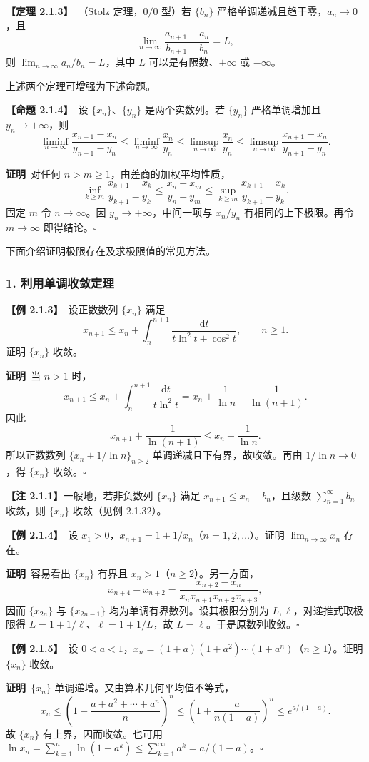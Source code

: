 \documentclass[UTF8,a4paper,11pt]{ctexart}
\newcommand{\ex}[1]{\par\medskip\noindent\textbf{【例 #1】}\ }
\newcommand{\prop}[1]{\par\medskip\noindent\textbf{【命题 #1】}\ }
\newcommand{\thm}[1]{\par\medskip\noindent\textbf{【定理 #1】}\ }
\newcommand{\pf}{\par\noindent\textbf{证明}\ }
\begin{document}
\thm{2.1.3}（Stolz 定理，$0/0$ 型）若 $\{b_n\}$ 严格单调递减且趋于零，$a_n\to0$，且
\[
\lim_{n\to\infty}\frac{a_{n+1}-a_n}{b_{n+1}-b_n}=L,
\]
则 $\lim_{n\to\infty}a_n/b_n=L$，其中 $L$ 可以是有限数、$+\infty$ 或 $-\infty$。

上述两个定理可增强为下述命题。

\prop{2.1.4}设 $\{x_n\}$、$\{y_n\}$ 是两个实数列。若 $\{y_n\}$ 严格单调增加且 $y_n\to+\infty$，则
\[
\liminf_{n\to\infty}\frac{x_{n+1}-x_n}{y_{n+1}-y_n}
\le\liminf_{n\to\infty}\frac{x_n}{y_n}
\le\limsup_{n\to\infty}\frac{x_n}{y_n}
\le\limsup_{n\to\infty}\frac{x_{n+1}-x_n}{y_{n+1}-y_n}.
\]
\pf 对任何 $n>m\ge1$，由差商的加权平均性质，
\[
\inf_{k\ge m}\frac{x_{k+1}-x_k}{y_{k+1}-y_k}
\le\frac{x_n-x_m}{y_n-y_m}
\le\sup_{k\ge m}\frac{x_{k+1}-x_k}{y_{k+1}-y_k}.
\]
固定 $m$ 令 $n\to\infty$。因 $y_n\to+\infty$，中间一项与 $x_n/y_n$ 有相同的上下极限。再令 $m\to\infty$ 即得结论。\hfill$\square$

下面介绍证明极限存在及求极限值的常见方法。

\subsubsection*{1. 利用单调收敛定理}
\ex{2.1.3}设正数数列 $\{x_n\}$ 满足
\[
x_{n+1}\le x_n+\int_n^{n+1}\frac{\mathrm dt}{t\ln^2t+\cos^2t},\qquad n\ge1.
\]
证明 $\{x_n\}$ 收敛。
\pf 当 $n>1$ 时，
\[
x_{n+1}\le x_n+\int_n^{n+1}\frac{\mathrm dt}{t\ln^2t}
=x_n+\frac1{\ln n}-\frac1{\ln(n+1)}.
\]
因此
\[
x_{n+1}+\frac1{\ln(n+1)}\le x_n+\frac1{\ln n}.
\]
所以正数数列 $\{x_n+1/\ln n\}_{n\ge2}$ 单调递减且下有界，故收敛。再由 $1/\ln n\to0$，得 $\{x_n\}$ 收敛。\hfill$\square$

\noindent\textbf{【注 2.1.1】}一般地，若非负数列 $\{x_n\}$ 满足 $x_{n+1}\le x_n+b_n$，且级数 $\sum_{n=1}^{\infty}b_n$ 收敛，则 $\{x_n\}$ 收敛（见例 2.1.32）。

\ex{2.1.4}设 $x_1>0$，$x_{n+1}=1+1/x_n$（$n=1,2,\ldots$）。证明 $\lim_{n\to\infty}x_n$ 存在。
\pf 容易看出 $\{x_n\}$ 有界且 $x_n>1$（$n\ge2$）。另一方面，
\[
x_{n+4}-x_{n+2}=\frac{x_{n+2}-x_n}{x_nx_{n+1}x_{n+2}x_{n+3}},
\]
因而 $\{x_{2n}\}$ 与 $\{x_{2n-1}\}$ 均为单调有界数列。设其极限分别为 $L,\ell$，对递推式取极限得 $L=1+1/\ell$、$\ell=1+1/L$，故 $L=\ell$。于是原数列收敛。\hfill$\square$

\ex{2.1.5}设 $0<a<1$，$x_n=(1+a)(1+a^2)\cdots(1+a^n)$（$n\ge1$）。证明 $\{x_n\}$ 收敛。
\pf $\{x_n\}$ 单调递增。又由算术几何平均值不等式，
\[
x_n\le\left(1+\frac{a+a^2+\cdots+a^n}{n}\right)^n
\le\left(1+\frac{a}{n(1-a)}\right)^n\le e^{a/(1-a)}.
\]
故 $\{x_n\}$ 有上界，因而收敛。也可用 $\ln x_n=\sum_{k=1}^{n}\ln(1+a^k)\le\sum_{k=1}^{\infty}a^k=a/(1-a)$。\hfill$\square$
\end{document}
